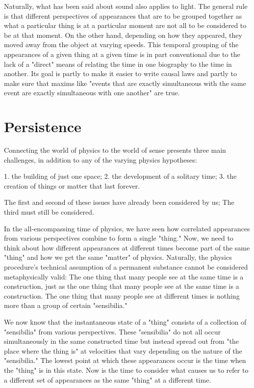 \documentclass[a4paper,12pt]{book}[2004/02/16]
\theoremstyle{ilemma}
\theoremstyle{itheorem}
\theoremstyle{iother}
\theoremstyle{icorollary}
\theoremstyle{numcorollary}
\theoremstyle{idefinition}
\begin{document}
Naturally, what has been said about sound also applies to light. The general rule is that different perspectives of appearances that are to be grouped together as what a particular thing is at a particular moment are not all to be considered to be at that moment. On the other hand, depending on how they appeared, they moved away from the object at varying speeds. This temporal grouping of the appearances of a given thing at a given time is in part conventional due to the lack of a "direct" means of relating the time in one biography to the time in another.
Its goal is partly to make it easier to write causal laws and partly to make sure that maxims like "events that are exactly simultaneous with the same event are exactly simultaneous with one another" are true.

\section{Persistence}
Connecting the world of physics to the world of sense presents three main challenges, in addition to any of the varying physics hypotheses:

    1. the building of just one space;
    2. the development of a solitary time;
    3. the creation of things or matter that last forever.

The first and second of these issues have already been considered by us; The third must still be considered.

In the all-encompassing time of physics, we have seen how correlated appearances from various perspectives combine to form a single "thing." Now, we need to think about how different appearances at different times become part of the same "thing" and how we get the same "matter" of physics. Naturally, the physics procedure's technical assumption of a permanent substance cannot be considered metaphysically valid: The one thing that many people see at the same time is a construction, just as the one thing that many people see at the same time is a construction. The one thing that many people see at different times is nothing more than a group of certain "sensibilia."

We now know that the instantaneous state of a "thing" consists of a collection of "sensibilia" from various perspectives. These "sensibilia" do not all occur simultaneously in the same constructed time but instead spread out from "the place where the thing is" at velocities that vary depending on the nature of the "sensibilia." The lowest point at which these appearances occur is the time when the "thing" is in this state. Now is the time to consider what causes us to refer to a different set of appearances as the same "thing" at a different time.
\end{document}
